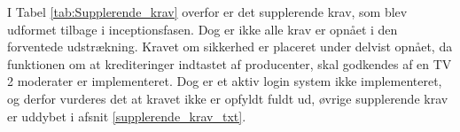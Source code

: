 I Tabel \ref{tab:Supplerende_krav} overfor er det supplerende krav, som blev udformet tilbage i inceptionsfasen. Dog er ikke alle krav er opnået i den forventede udstrækning. Kravet om sikkerhed er placeret under delvist opnået, da funktionen om at krediteringer indtastet af producenter, skal godkendes af en TV 2 moderater er implementeret. Dog er et aktiv login system ikke implementeret, og derfor vurderes det at kravet ikke er opfyldt fuldt ud, øvrige supplerende krav er uddybet i afsnit \ref{supplerende_krav_txt}.

